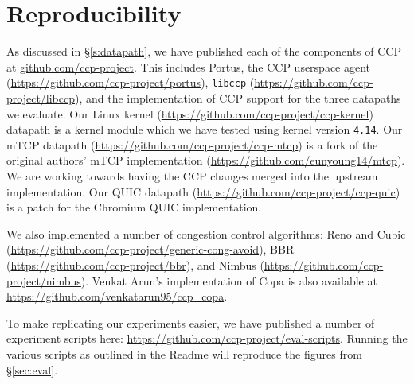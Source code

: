 \section{Reproducibility}
\label{sec:repro}

As discussed in \S\ref{s:datapath}, we have published each of the components of CCP at \url{github.com/ccp-project}. 
This includes Portus, the CCP userspace agent (\url{https://github.com/ccp-project/portus}), \texttt{libccp} (\url{https://github.com/ccp-project/libccp}), and the implementation of CCP support for the three datapaths we evaluate. 
Our Linux kernel (\url{https://github.com/ccp-project/ccp-kernel}) datapath is a kernel module which we have tested using kernel version \texttt{4.14}. 
Our mTCP datapath (\url{https://github.com/ccp-project/ccp-mtcp}) is a fork of the original authors' mTCP implementation (\url{https://github.com/eunyoung14/mtcp}). We are working towards having the CCP changes merged into the upstream implementation.
Our QUIC datapath (\url{https://github.com/ccp-project/ccp-quic}) is a patch for the Chromium QUIC implementation. 

We also implemented a number of congestion control algorithms: 
Reno and Cubic (\url{https://github.com/ccp-project/generic-cong-avoid}), 
BBR (\url{https://github.com/ccp-project/bbr}), 
and Nimbus (\url{https://github.com/ccp-project/nimbus}). 
Venkat Arun's implementation of Copa is also available at \url{https://github.com/venkatarun95/ccp_copa}.

To make replicating our experiments easier, we have published a number of experiment scripts here: \url{https://github.com/ccp-project/eval-scripts}. 
Running the various scripts as outlined in the Readme will reproduce the figures from \S\ref{sec:eval}.
